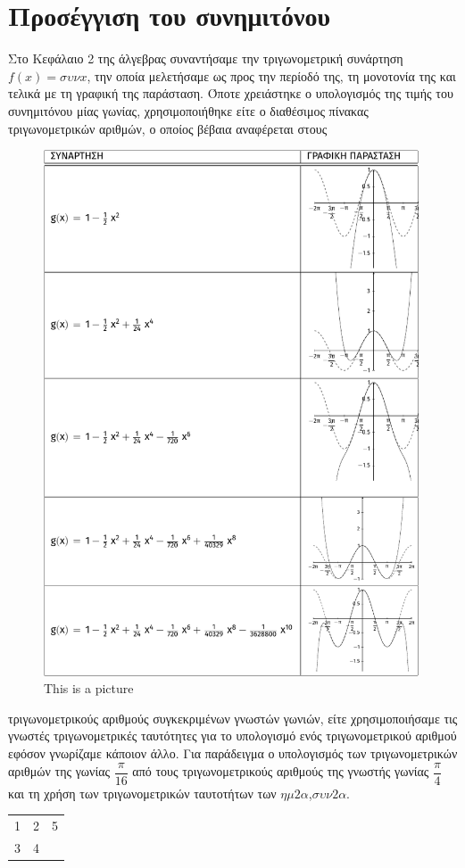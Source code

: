 \documentclass[12pt]{article}
\begin{document}
\section*{Προσέγγιση του συνημιτόνου}
Στο Κεφάλαιο 2 της άλγεβρας συναντήσαμε την τριγωνομετρική συνάρτηση ${f(x)=συνx}$, την οποία μελετήσαμε ως προς την περίοδό της, τη μονοτονία της και τελικά με τη γραφική της παράσταση. Όποτε χρειάστηκε ο υπολογισμός της τιμής του συνημιτόνου μίας γωνίας, χρησιμοποιήθηκε είτε ο διαθέσιμος πίνακας τριγωνομετρικών αριθμών, ο οποίος βέβαια αναφέρεται στους \begin{figure}[h]
	\centering	\includegraphics[width=0.99\textwidth]{tikzpic1.pdf}
	\caption{This is a picture}
\end{figure}τριγωνομετρικούς αριθμούς συγκεκριμένων γνωστών γωνιών, είτε χρησιμοποιήσαμε τις γνωστές τριγωνομετρικές ταυτότητες για το υπολογισμό ενός τριγωνομετρικού αριθμού εφόσον γνωρίζαμε κάποιον άλλο. Για παράδειγμα ο υπολογισμός των τριγωνομετρικών αριθμών της γωνίας $\dfrac{π}{16}$ από τους τριγωνομετρικούς αριθμούς της γνωστής γωνίας $\dfrac{π}{4}$ και τη χρήση των τριγωνομετρικών ταυτοτήτων των $ημ2α$,$συν2α$.
\begin{tabular}{||l|cr|}
\hline
1 & 2& 5\\\cline{2-3}
3 & 4&  \\\hline
\end{tabular}
\end{document}
